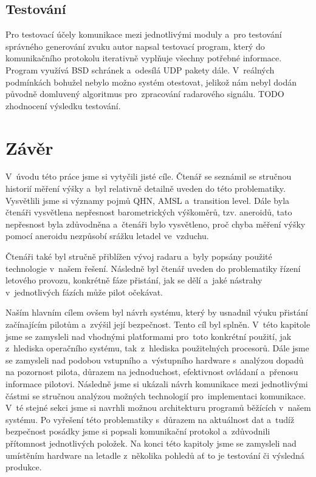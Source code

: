 	\section{Testování}
	Pro testovací účely komunikace mezi jednotlivými moduly a~pro testování správného generování zvuku autor napsal testovací program, který do komunikačního protokolu iterativně vyplňuje všechny potřebné informace. Program využívá BSD schránek a~odesílá UDP pakety dále.
	V~reálných podmínkách bohužel nebylo možno systém otestovat, jelikož nám nebyl dodán původně domluvený algoritmus pro~zpracování radarového signálu. TODO zhodnocení výsledku testování.
	
\chapter{Závěr}
	V~úvodu této práce jsme si vytyčili jisté cíle. Čtenář se seznámil se stručnou historií měření výšky a~byl relativně detailně uveden do této problematiky. Vysvětlili jsme si významy pojmů QHN, AMSL a~transition level. Dále byla čtenáři vysvětlena nepřesnost barometrických výškoměrů, tzv. aneroidů, tato nepřesnost byla zdůvodněna a~čtenáři bylo vysvětleno, proč chyba měření výšky pomocí aneroidu nezpůsobí srážku letadel ve~vzduchu.\par
	Čtenáři také byl stručně přiblížen vývoj radaru a~byly popsány použité technologie v~našem řešení. Následně byl čtenář uveden do problematiky řízení letového provozu, konkrétně fáze přistání, jak se dělí a~jaké nástrahy v~jednotlivých fázích může pilot očekávat.\par
	Naším hlavním cílem ovšem byl návrh systému, který by usnadnil výuku přistání začínajícím pilotům a~zvýšil její bezpečnost. Tento cíl byl splněn. V~této kapitole jsme se zamysleli nad vhodnými platformami pro~toto konkrétní použití, jak z~hlediska operačního systému, tak~z~hlediska použitelných procesorů. Dále jsme se zamysleli nad podobou vstupního a~výstupního hardware s~analýzou dopadů na pozornost pilota, důrazem na jednoduchost, efektivnost ovládaní a~přenosu informace pilotovi. Následně jsme si ukázali návrh komunikace mezi jednotlivými částmi se stručnou analýzou možných technologií pro~implementaci komunikace. V~té stejné sekci jsme si navrhli možnou architekturu programů běžících v~našem systému. Po vyřešení této problematiky s~důrazem na aktuálnost dat a~tudíž bezpečnost posádky jsme si popsali komunikační protokol a~zdůvodnili přítomnost jednotlivých položek. Na konci této kapitoly jsme se zamysleli nad umístěním hardware na letadle z~několika pohledů ať to je testování či výsledná produkce.\par
